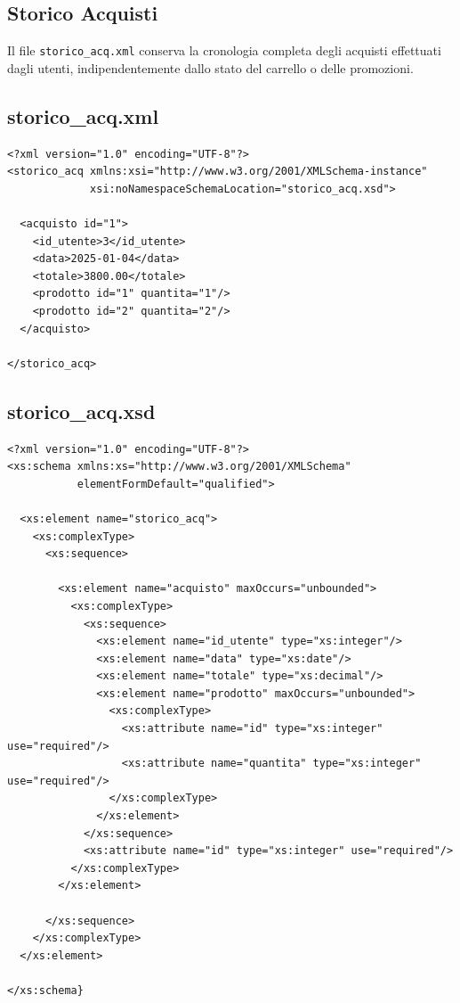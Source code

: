 \documentclass[a4paper,12pt]{report}
\begin{document}

\subsection*{Storico Acquisti}

Il file \texttt{storico\_acq.xml} conserva la cronologia completa degli acquisti
effettuati dagli utenti, indipendentemente dallo stato del carrello o delle promozioni.

\subsection*{storico\_acq.xml}

\begin{lstlisting}
<?xml version="1.0" encoding="UTF-8"?>
<storico_acq xmlns:xsi="http://www.w3.org/2001/XMLSchema-instance"
             xsi:noNamespaceSchemaLocation="storico_acq.xsd">

  <acquisto id="1">
    <id_utente>3</id_utente>
    <data>2025-01-04</data>
    <totale>3800.00</totale>
    <prodotto id="1" quantita="1"/>
    <prodotto id="2" quantita="2"/>
  </acquisto>

</storico_acq>
\end{lstlisting}

\subsection*{storico\_acq.xsd}

\begin{lstlisting}
<?xml version="1.0" encoding="UTF-8"?>
<xs:schema xmlns:xs="http://www.w3.org/2001/XMLSchema"
           elementFormDefault="qualified">

  <xs:element name="storico_acq">
    <xs:complexType>
      <xs:sequence>

        <xs:element name="acquisto" maxOccurs="unbounded">
          <xs:complexType>
            <xs:sequence>
              <xs:element name="id_utente" type="xs:integer"/>
              <xs:element name="data" type="xs:date"/>
              <xs:element name="totale" type="xs:decimal"/>
              <xs:element name="prodotto" maxOccurs="unbounded">
                <xs:complexType>
                  <xs:attribute name="id" type="xs:integer" use="required"/>
                  <xs:attribute name="quantita" type="xs:integer" use="required"/>
                </xs:complexType>
              </xs:element>
            </xs:sequence>
            <xs:attribute name="id" type="xs:integer" use="required"/>
          </xs:complexType>
        </xs:element>

      </xs:sequence>
    </xs:complexType>
  </xs:element>

</xs:schema}
\end{lstlisting}
\end{document}
